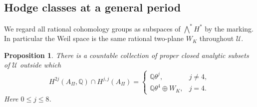 \documentclass[11pt]{article}
\newtheorem{proposition}[theorem]{Proposition}
\theoremstyle{definition}
\theoremstyle{remark}
\numberwithin{equation}{section}
\begin{document}
\subsection{Hodge classes at a general period}

We regard all rational cohomology groups as subspaces of
$\bigwedge^*H^*$ by the marking.  In particular the Weil space is the
same rational two-plane $W_K$ throughout $\mathcal U$.

\begin{proposition}
\label{hodge:generic-hodge}
There is a countable collection of proper closed analytic subsets of
$\mathcal U$ outside which
\begin{equation}
 H^{2j}(A_\Pi,\mathbb Q)\cap H^{j,j}(A_\Pi)=
 \begin{cases}
  \mathbb Q\theta^j,&j\ne4,\\
  \mathbb Q\theta^4\oplus W_K,&j=4.
 \end{cases}
 \label{hodge:generic-classes}
\end{equation}
Here $0\le j\le8$.
\end{proposition}
\end{document}
